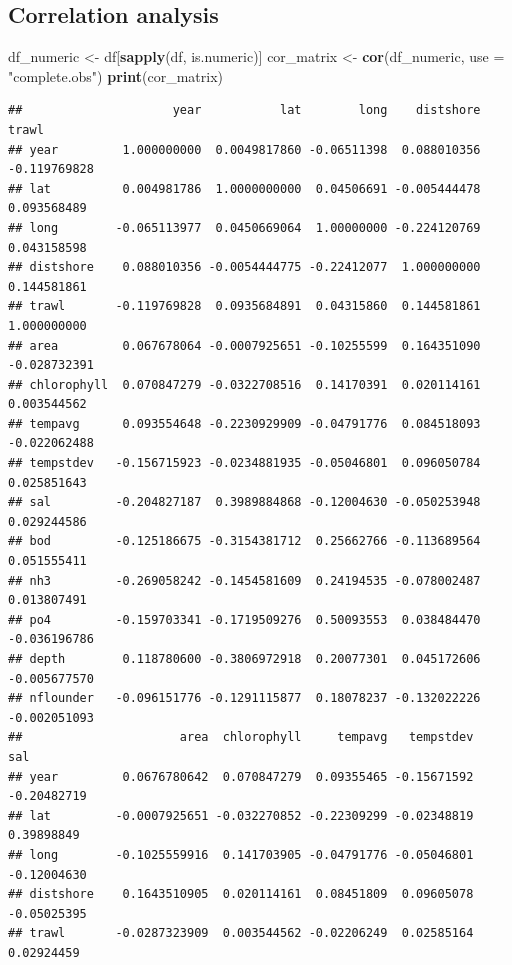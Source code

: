 \documentclass[
]{article}
\newenvironment{Shaded}{\begin{snugshade}}{\end{snugshade}}
\newcommand{\AttributeTok}[1]{\textcolor[rgb]{0.13,0.29,0.53}{#1}}
\newcommand{\FunctionTok}[1]{\textcolor[rgb]{0.13,0.29,0.53}{\textbf{#1}}}
\newcommand{\NormalTok}[1]{#1}
\newcommand{\OtherTok}[1]{\textcolor[rgb]{0.56,0.35,0.01}{#1}}
\newcommand{\StringTok}[1]{\textcolor[rgb]{0.31,0.60,0.02}{#1}}
\begin{document}
\subsection{Correlation analysis}\label{correlation-analysis}

\begin{Shaded}
\begin{Highlighting}[]
\NormalTok{df\_numeric }\OtherTok{\textless{}{-}}\NormalTok{ df[}\FunctionTok{sapply}\NormalTok{(df, is.numeric)]}
\NormalTok{cor\_matrix }\OtherTok{\textless{}{-}} \FunctionTok{cor}\NormalTok{(df\_numeric, }\AttributeTok{use =} \StringTok{"complete.obs"}\NormalTok{)}
\FunctionTok{print}\NormalTok{(cor\_matrix)}
\end{Highlighting}
\end{Shaded}

\begin{verbatim}
##                     year           lat        long    distshore        trawl
## year         1.000000000  0.0049817860 -0.06511398  0.088010356 -0.119769828
## lat          0.004981786  1.0000000000  0.04506691 -0.005444478  0.093568489
## long        -0.065113977  0.0450669064  1.00000000 -0.224120769  0.043158598
## distshore    0.088010356 -0.0054444775 -0.22412077  1.000000000  0.144581861
## trawl       -0.119769828  0.0935684891  0.04315860  0.144581861  1.000000000
## area         0.067678064 -0.0007925651 -0.10255599  0.164351090 -0.028732391
## chlorophyll  0.070847279 -0.0322708516  0.14170391  0.020114161  0.003544562
## tempavg      0.093554648 -0.2230929909 -0.04791776  0.084518093 -0.022062488
## tempstdev   -0.156715923 -0.0234881935 -0.05046801  0.096050784  0.025851643
## sal         -0.204827187  0.3989884868 -0.12004630 -0.050253948  0.029244586
## bod         -0.125186675 -0.3154381712  0.25662766 -0.113689564  0.051555411
## nh3         -0.269058242 -0.1454581609  0.24194535 -0.078002487  0.013807491
## po4         -0.159703341 -0.1719509276  0.50093553  0.038484470 -0.036196786
## depth        0.118780600 -0.3806972918  0.20077301  0.045172606 -0.005677570
## nflounder   -0.096151776 -0.1291115877  0.18078237 -0.132022226 -0.002051093
##                      area  chlorophyll     tempavg   tempstdev         sal
## year         0.0676780642  0.070847279  0.09355465 -0.15671592 -0.20482719
## lat         -0.0007925651 -0.032270852 -0.22309299 -0.02348819  0.39898849
## long        -0.1025559916  0.141703905 -0.04791776 -0.05046801 -0.12004630
## distshore    0.1643510905  0.020114161  0.08451809  0.09605078 -0.05025395
## trawl       -0.0287323909  0.003544562 -0.02206249  0.02585164  0.02924459

\end{verbatim}
\end{document}
